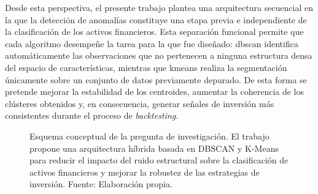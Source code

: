 \documentclass[
]{article}
\begin{document}
	Desde esta perspectiva, el presente trabajo plantea una arquitectura secuencial en la que la detección de anomalías constituye una etapa previa e independiente de la clasificación de los activos financieros. Esta separación funcional permite que cada algoritmo desempeñe la tarea para la que fue diseñado: \gls{dbscan} identifica automáticamente las observaciones que no pertenecen a ninguna estructura densa del espacio de características, mientras que \gls{kmeans} realiza la segmentación únicamente sobre un conjunto de datos previamente depurado. De esta forma se pretende mejorar la estabilidad de los centroides, aumentar la coherencia de los clústeres obtenidos y, en consecuencia, generar señales de inversión más consistentes durante el proceso de \emph{backtesting}.
	
	\begin{figure}[H]
		\centering
		
		
		\caption{Esquema conceptual de la pregunta de investigación. El trabajo propone una arquitectura híbrida basada en DBSCAN y K-Means para reducir el impacto del ruido estructural sobre la clasificación de activos financieros y mejorar la robustez de las estrategias de inversión. Fuente: Elaboración propia.}
		
		\label{fig:pregunta}
	\end{figure}
	
\end{document}
